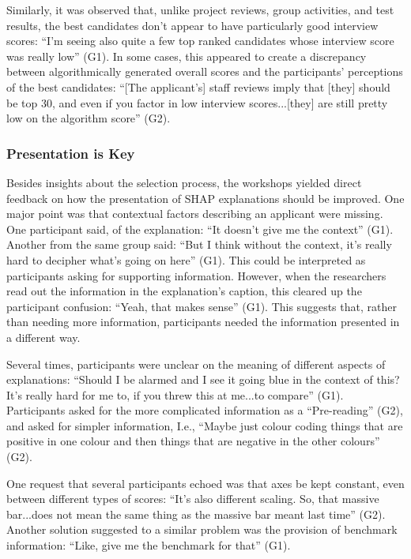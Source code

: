 Similarly, it was observed that, unlike project reviews, group activities, and test results, the best candidates don't appear to have particularly good interview scores: ``I'm seeing also quite a few top ranked candidates whose interview score was really low'' (G1). In some cases, this appeared to create a discrepancy between algorithmically generated overall scores and the participants' perceptions of the best candidates: ``[The applicant's] staff reviews imply that [they] should be top 30, and even if you factor in low interview scores...[they] are still pretty low on the algorithm score'' (G2).

\subsubsection{Presentation is Key}
Besides insights about the selection process, the workshops yielded direct feedback on how the presentation of SHAP explanations should be improved. One major point was that contextual factors describing an applicant were missing. One participant said, of the explanation: ``It doesn't give me the context'' (G1). Another from the same group said: ``But I think without the context, it's really hard to decipher what's going on here'' (G1). This could be interpreted as participants asking for supporting information. However, when the researchers read out the information in the explanation's caption, this cleared up the participant confusion: ``Yeah, that makes sense'' (G1). This suggests that, rather than needing more information, participants needed the information presented in a different way.

Several times, participants were unclear on the meaning of different aspects of explanations: ``Should I be alarmed and I see it going blue in the context of this? It's really hard for me to, if you threw this at me...to compare'' (G1). Participants asked for the more complicated information as a ``Pre-reading'' (G2), and asked for simpler information, I.e., ``Maybe just colour coding things that are positive in one colour and then things that are negative in the other colours'' (G2).

One request that several participants echoed was that axes be kept constant, even between different types of scores: ``It's also different scaling. So, that massive bar...does not mean the same thing as the massive bar meant last time'' (G2). Another solution suggested to a similar problem was the provision of benchmark information: ``Like, give me the benchmark for that'' (G1).

